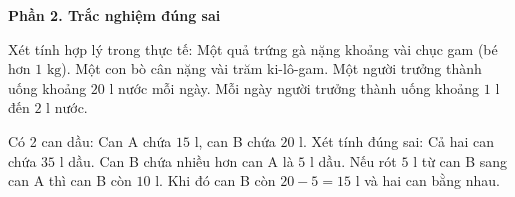 \textbf{Phần 2. Trắc nghiệm đúng sai}

\begin{ex} %
Xét tính hợp lý trong thực tế:
\choiceTF
{\True Một quả trứng gà nặng khoảng vài chục gam (bé hơn $1\text{ kg}$).}
{\True Một con bò cân nặng vài trăm ki-lô-gam.}
{Một người trưởng thành uống khoảng $20\text{ l}$ nước mỗi ngày.}
{\True Mỗi ngày người trưởng thành uống khoảng $1\text{ l}$ đến $2\text{ l}$ nước.}
\end{ex}

\begin{ex} %
Có 2 can dầu: Can A chứa $15\text{ l}$, can B chứa $20\text{ l}$. Xét tính đúng sai:
\choiceTF
{\True Cả hai can chứa $35\text{ l}$ dầu.}
{\True Can B chứa nhiều hơn can A là $5\text{ l}$ dầu.}
{Nếu rót $5\text{ l}$ từ can B sang can A thì can B còn $10\text{ l}$.}
{\True Khi đó can B còn $20 - 5 = 15\text{ l}$ và hai can bằng nhau.}
\end{ex}


